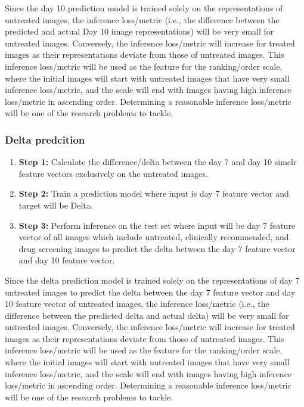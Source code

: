 Since the day 10 prediction model is trained solely on the representations of untreated images, the inference loss/metric 
(i.e., the difference between the predicted and actual Day 10 image representations) will be very small for untreated images.
 Conversely, the inference loss/metric will increase for treated images as their representations deviate from those of untreated images.
This inference loss/metric will be used as the feature for the ranking/order scale, where the initial images will start 
with untreated images that have very small inference loss/metric, and the scale will end with images having high inference loss/metric in ascending order. 
Determining a reasonable inference loss/metric will be one of the research problems to tackle.

\subsubsection{Delta predcition}
\begin{enumerate}
  \item \textbf{Step 1:} Calculate the difference/delta between the day 7 and day 10 simclr 
  feature vectors  exclusively on the untreated images.
  \item \textbf{Step 2:} Train a prediction model where input is day 7 feature vector 
  and target will be Delta.


  \item \textbf{Step 3:} Perform inference on the test set where input will be day 7 feature vector of all images which include untreated, 
  clinically recommended, and drug screening images to predict the delta between the day 7 feature vector  and day 10 feature vector.
\end{enumerate}

Since the delta prediction model is trained solely on the representations of day 
7 untreated  images to predict the delta between the day 7 feature vector 
and day 10 feature vector of untreated images,
 the inference loss/metric (i.e., the difference between the predicted delta and actual
  delta) will be very small for untreated images. Conversely,
   the inference loss/metric will increase for treated images as their representations 
   deviate from those of untreated images. This inference loss/metric will be used as 
   the feature for the ranking/order scale, where the initial images will start with 
   untreated images that have very small inference loss/metric, and the scale will end 
   with images having high inference loss/metric in ascending order. 
   Determining a reasonable inference loss/metric will be one of the research problems 
   to tackle.



